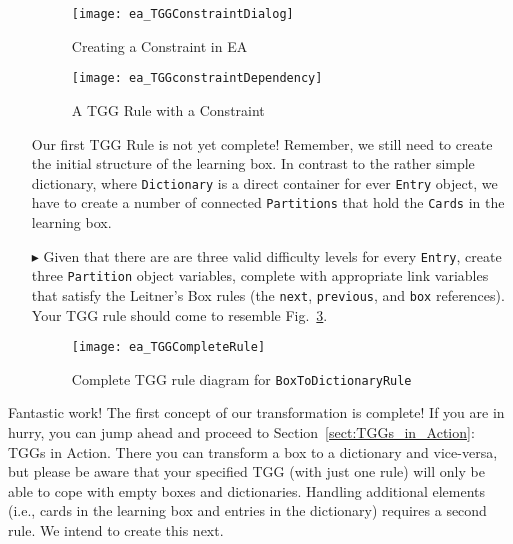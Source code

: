 \begin{enumerate}
\newpage

\begin{figure}[htbp]
\begin{center}
  \texttt{[image: ea\_TGGConstraintDialog]}
  \caption{Creating a Constraint in EA}
  \label{fig:first_tgg_constraint}
\end{center}
\end{figure}

\vspace{1cm}

\begin{figure}[h!]
\begin{center}
  \texttt{[image: ea\_TGGconstraintDependency]}
  \caption{A TGG Rule with a Constraint}
  \label{fig:tgg_rule_with_constraint}
  \end{center}
\end{figure}

\newpage

Our first TGG Rule is not yet complete! Remember, we still need to create the initial structure of the learning box. In contrast to the rather
simple dictionary, where \texttt{Dictionary} is a direct container for ever \texttt{Entry} object, we have to create a number of connected \texttt{Partitions}
that hold the \texttt{Cards} in the learning box. 

\item[$\blacktriangleright$] Given that there are are three valid difficulty levels for every \texttt{Entry}, create three \texttt{Partition} object variables,
complete with appropriate link variables that satisfy the Leitner's Box rules (the \texttt{next}, \texttt{previous}, and \texttt{box} references). Your TGG rule
should come to resemble Fig.~\ref{fig:boxtodictionaryrule_complete}.


\begin{figure}[htbp]
\begin{center}
  \texttt{[image: ea\_TGGCompleteRule]}
  \caption{Complete TGG rule diagram for \texttt{BoxToDictionaryRule}}
  \label{fig:boxtodictionaryrule_complete}
\end{center}
\end{figure}

\end{enumerate}


Fantastic work! The first concept of our transformation is complete! If you are in hurry, you can jump ahead and proceed to Section~\ref{sect:TGGs_in_Action}:
TGGs in Action. There you can transform a box to a dictionary and vice-versa, but please be aware that your specified TGG (with just one rule) will only be
able to cope with empty boxes and dictionaries. Handling additional elements (i.e., cards in the learning box and entries in the dictionary) requires a second rule. We
intend to create this next.

